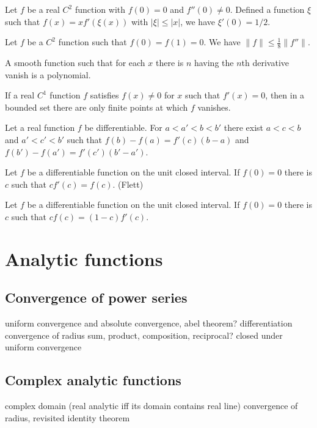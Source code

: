 \documentclass{../note}
\begin{document}
\begin{prb}
Let $f$ be a real $C^2$ function with $f(0)=0$ and $f''(0)\ne0$.
Defined a function $\xi$ such that $f(x)=xf'(\xi(x))$ with $|\xi|\le|x|$, we have $\xi'(0)=1/2$.
\end{prb}

\begin{prb}
Let $f$ be a $C^2$ function such that $f(0)=f(1)=0$.
We have $\|f\|\le\frac18\|f''\|$.
\end{prb}

\begin{prb}
A smooth function such that for each $x$ there is $n$ having the $n$th derivative vanish is a polynomial.
\end{prb}

\begin{prb}
If a real $C^1$ function $f$ satisfies $f(x)\ne0$ for $x$ such that $f'(x)=0$, then in a bounded set there are only finite points at which $f$ vanishes.
\end{prb}

\begin{prb}
Let a real function $f$ be differentiable.
For $a<a'<b<b'$ there exist $a<c<b$ and $a'<c'<b'$ such that $f(b)-f(a)=f'(c)(b-a)$ and $f(b')-f(a')=f'(c')(b'-a')$.
\end{prb}

\begin{prb}
Let $f$ be a differentiable function on the unit closed interval.
If $f(0)=0$ there is $c$ such that $cf'(c)=f(c)$. (Flett)
\end{prb}

\begin{prb}
Let $f$ be a differentiable function on the unit closed interval.
If $f(0)=0$ there is $c$ such that $cf(c)=(1-c)f'(c)$.
\end{prb}


\chapter{Analytic functions}
\section{Convergence of power series}
uniform convergence and absolute convergence, abel theorem?
differentiation
convergence of radius
sum, product, composition, reciprocal?
closed under uniform convergence
\section{Complex analytic functions}
complex domain
(real analytic iff its domain contains real line)
convergence of radius, revisited
identity theorem
\end{document}

